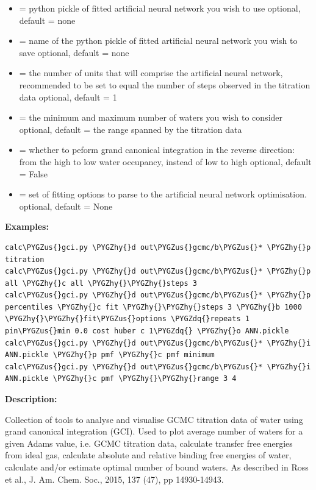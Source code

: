 \documentclass[letterpaper,10pt,english]{sphinxmanual}
\def\PYGZus{\char`\_}
\def\PYGZhy{\char`\-}
\def\PYGZdq{\char`\"}
\begin{document}
\begin{itemize}
\item {} 
 = python pickle of fitted artificial neural network you wish to use
optional, default = none

\item {} 
 = name of the python pickle of fitted artificial neural network you wish to save
optional, default = none

\item {} 
 = the number of units that will comprise the artificial neural network, recommended to be set to equal the number of steps observed in the titration data
optional, default = 1

\item {} 
 = the minimum and maximum number of waters you wish to consider
optional, default = the range spanned by the titration data

\item {} 
 = whether to peform grand canonical integration in the reverse direction: from the high to low water occupancy, instead of low to high
optional, default = False

\item {} 
 = set of fitting options to parse to the artificial neural network optimisation.
optional, default = None

\end{itemize}

\textbf{Examples:}

\begin{Verbatim}[commandchars=\\\{\}]
calc\PYGZus{}gci.py \PYGZhy{}d out\PYGZus{}gcmc/b\PYGZus{}* \PYGZhy{}p titration
calc\PYGZus{}gci.py \PYGZhy{}d out\PYGZus{}gcmc/b\PYGZus{}* \PYGZhy{}p all \PYGZhy{}c all \PYGZhy{}\PYGZhy{}steps 3
calc\PYGZus{}gci.py \PYGZhy{}d out\PYGZus{}gcmc/b\PYGZus{}* \PYGZhy{}p percentiles \PYGZhy{}c fit \PYGZhy{}\PYGZhy{}steps 3 \PYGZhy{}b 1000 \PYGZhy{}\PYGZhy{}fit\PYGZus{}options \PYGZdq{}repeats 1 pin\PYGZus{}min 0.0 cost huber c 1\PYGZdq{} \PYGZhy{}o ANN.pickle
calc\PYGZus{}gci.py \PYGZhy{}d out\PYGZus{}gcmc/b\PYGZus{}* \PYGZhy{}i ANN.pickle \PYGZhy{}p pmf \PYGZhy{}c pmf minimum
calc\PYGZus{}gci.py \PYGZhy{}d out\PYGZus{}gcmc/b\PYGZus{}* \PYGZhy{}i ANN.pickle \PYGZhy{}c pmf \PYGZhy{}\PYGZhy{}range 3 4
\end{Verbatim}

\textbf{Description:}

Collection of tools to analyse and visualise GCMC titration data of water using grand canonical integration (GCI). Used to plot average number of waters for a given Adams value, i.e. GCMC titration data, calculate transfer free energies from ideal gas, calculate absolute and relative binding free energies of water, calculate and/or estimate optimal number of bound waters. As described in Ross et al., J. Am. Chem. Soc., 2015, 137 (47), pp 14930-14943.
\end{document}
